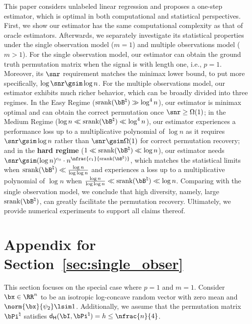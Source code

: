 \documentclass[11pt]{article}
\def \dH {\mathsf{d_H}}
\def \bPitrue {\bPi^{\natural}}
\def \bBtrue {\bB^{\natural}}
\def\srank#1{\textup{srank}(#1)}
\begin{document}
This paper considers unlabeled linear regression
and proposes a one-step estimator,
which is optimal in both
computational and statistical perspectives.
First, we show
our estimator has the same computational complexity
as that of oracle estimators.
Afterwards, we separately investigate its statistical properties
under the single observation model ($m = 1$) and multiple observations
model ($m > 1$).
For the single observation model, our estimator can obtain the
ground truth permutation matrix when the signal is with length one, i.e.,
$p = 1$. Moreover, its $\snr$ requirement matches the minimax lower bound, to put
more specifically, $\log \snr \gsim \log n$.
For the multiple observations model,
our estimator exhibits much richer behavior, which can be broadly
divided into three regimes.
In the Easy Regime ($\srank{\bBtrue}\gg \log^4 n$), our estimator is minimax optimal
and can obtain the correct permutation
once $\snr \geq \Omega(1)$; in the Medium Regime ($\log n \ll \srank{\bBtrue}\ll \log^4 n$),
our estimator experiences a performance loss up to
a multiplicative polynomial of $\log n$ as it
requires $\snr  \gsim \log n$ rather than $\snr \gsim \Omega(1)$
for correct permutation recovery;
and in the \textbf{hard regime} ($1\ll \srank{\bBtrue} \ll \log n$), our estimator
needs $\snr \gsim (\log n)^{c_0} \cdot n^{\nfrac{c_1}{\srank{\bBtrue}}}$, which
matches the statistical limits when
$\srank{\bBtrue} \ll \frac{\log n}{\log \log n}$ and
experiences a loss up to a multiplicative polynomial
of $\log n$ when $\frac{\log n}{\log\log n} \ll \srank{\bBtrue} \ll \log n$.
Comparing with the single observation model, we conclude that
high diversity, namely, large $\srank{\bBtrue}$, can
greatly facilitate the permutation recovery.
Ultimately, we provide numerical experiments to support all claims thereof.

\vspace{0.5in}





\newpage
\pagebreak
\appendix
\section{Appendix for Section~\ref{sec:single_obser}}
\label{sec:single_proof_appendix}

This section focuses on the special case where
$p=1$ and  $m =1$.
Consider $\bx\in \RR^n$ to be an
isotropic log-concave random vector
with zero mean and $\norm{\bx}{\psi_2} \lsim 1$.
Additionally, we assume that the permutation matrix $\bPitrue$
satisfies $\dH(\bI, \bPitrue) = h \leq \nfrac{n}{4}$.
\end{document}
